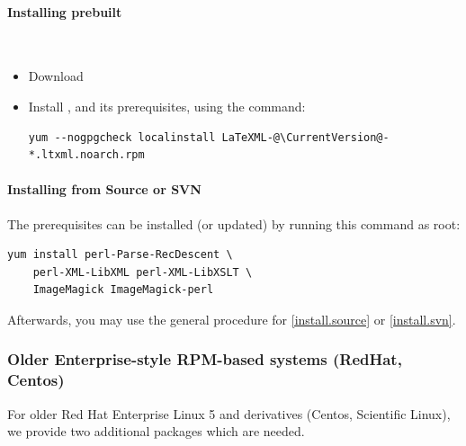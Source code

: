 \documentclass{article}
\begin{document}
\paragraph{Installing prebuilt}\\
\begin{itemize}
\item Download \CurrentFedora
\item Install \LaTeXML, and its prerequisites, using the command:
\begin{lstlisting}[style=shell]
   yum --nogpgcheck localinstall LaTeXML-@\CurrentVersion@-*.ltxml.noarch.rpm
\end{lstlisting}
\end{itemize}

\paragraph{Installing from Source or SVN}
The prerequisites can be installed (or updated) by running this command as root: 
\begin{lstlisting}[style=shell]
yum install perl-Parse-RecDescent \
    perl-XML-LibXML perl-XML-LibXSLT \
    ImageMagick ImageMagick-perl
\end{lstlisting}
Afterwards, you may use the general procedure for
\ref{install.source} or \ref{install.svn}.

\subsubsection[Older Enterprise systems]{Older Enterprise-style RPM-based systems (RedHat, Centos)}\label{install.enterprise}
For older Red Hat Enterprise Linux 5 and derivatives (Centos, Scientific Linux),
we provide two additional packages which are needed.
\end{document}
